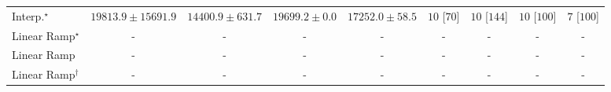 \begin{tabular}{l|cccc|cccc|}
Interp.$^\star$ & {\cellcolor[HTML]{FFF9C7}} \color[HTML]{000000} $19813.9\pm 15691.9$ & {\cellcolor[HTML]{FFFFE5}} \color[HTML]{000000} $14400.9\pm 631.7$ & {\cellcolor[HTML]{FFF9C7}} \color[HTML]{000000} $19699.2\pm 0.0$ & {\cellcolor[HTML]{FFFCD6}} \color[HTML]{000000} $17252.0\pm 58.5$ & {\cellcolor[HTML]{49006A}} \color[HTML]{F1F1F1} $10$ [$70$] & {\cellcolor[HTML]{49006A}} \color[HTML]{F1F1F1} $10$ [$144$] & {\cellcolor[HTML]{49006A}} \color[HTML]{F1F1F1} $10$ [$100$] & {\cellcolor[HTML]{CD238F}} \color[HTML]{F1F1F1} $7$ [$100$] \\
Linear Ramp$^\star$ & {\cellcolor[HTML]{000000}} \color[HTML]{F1F1F1} {\cellcolor{white}} \color{black} - & {\cellcolor[HTML]{000000}} \color[HTML]{F1F1F1} {\cellcolor{white}} \color{black} - & {\cellcolor[HTML]{000000}} \color[HTML]{F1F1F1} {\cellcolor{white}} \color{black} - & {\cellcolor[HTML]{000000}} \color[HTML]{F1F1F1} {\cellcolor{white}} \color{black} - & {\cellcolor[HTML]{000000}} \color[HTML]{F1F1F1} {\cellcolor{white}} \color{black} - & {\cellcolor[HTML]{000000}} \color[HTML]{F1F1F1} {\cellcolor{white}} \color{black} - & {\cellcolor[HTML]{000000}} \color[HTML]{F1F1F1} {\cellcolor{white}} \color{black} - & {\cellcolor[HTML]{000000}} \color[HTML]{F1F1F1} {\cellcolor{white}} \color{black} - \\
Linear Ramp & {\cellcolor[HTML]{000000}} \color[HTML]{F1F1F1} {\cellcolor{white}} \color{black} - & {\cellcolor[HTML]{000000}} \color[HTML]{F1F1F1} {\cellcolor{white}} \color{black} - & {\cellcolor[HTML]{000000}} \color[HTML]{F1F1F1} {\cellcolor{white}} \color{black} - & {\cellcolor[HTML]{000000}} \color[HTML]{F1F1F1} {\cellcolor{white}} \color{black} - & {\cellcolor[HTML]{000000}} \color[HTML]{F1F1F1} {\cellcolor{white}} \color{black} - & {\cellcolor[HTML]{000000}} \color[HTML]{F1F1F1} {\cellcolor{white}} \color{black} - & {\cellcolor[HTML]{000000}} \color[HTML]{F1F1F1} {\cellcolor{white}} \color{black} - & {\cellcolor[HTML]{000000}} \color[HTML]{F1F1F1} {\cellcolor{white}} \color{black} - \\
Linear Ramp$^\dagger$ & {\cellcolor[HTML]{000000}} \color[HTML]{F1F1F1} {\cellcolor{white}} \color{black} - & {\cellcolor[HTML]{000000}} \color[HTML]{F1F1F1} {\cellcolor{white}} \color{black} - & {\cellcolor[HTML]{000000}} \color[HTML]{F1F1F1} {\cellcolor{white}} \color{black} - & {\cellcolor[HTML]{000000}} \color[HTML]{F1F1F1} {\cellcolor{white}} \color{black} - & {\cellcolor[HTML]{000000}} \color[HTML]{F1F1F1} {\cellcolor{white}} \color{black} - & {\cellcolor[HTML]{000000}} \color[HTML]{F1F1F1} {\cellcolor{white}} \color{black} - & {\cellcolor[HTML]{000000}} \color[HTML]{F1F1F1} {\cellcolor{white}} \color{black} - & {\cellcolor[HTML]{000000}} \color[HTML]{F1F1F1} {\cellcolor{white}} \color{black} - \\

\end{tabular}
